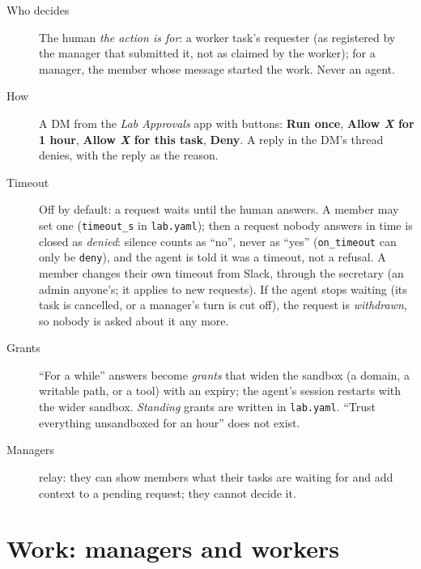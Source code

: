 \documentclass[11pt]{article}
\newcommand{\code}[1]{\texttt{#1}}
\begin{document}
\begin{description}
  \item[Who decides] The human \emph{the action is for}: a worker task's requester (as
    registered by the manager that submitted it, not as claimed by the worker); for a
    manager, the member whose message started the work. Never an agent.
  \item[How] A DM from the \emph{Lab Approvals} app with buttons: \textbf{Run once},
    \textbf{Allow \emph{X} for 1 hour}, \textbf{Allow \emph{X} for this task}, \textbf{Deny}.
    A reply in the DM's thread denies, with the reply as the reason.
  \item[Timeout] Off by default: a request waits until the human answers. A member may set
    one (\code{timeout\_s} in \code{lab.yaml}); then a request nobody answers in time is
    closed as \emph{denied}: silence counts as ``no'', never as ``yes'' (\code{on\_timeout}
    can only be \code{deny}), and the agent is told it was a timeout, not a refusal. A
    member changes their own timeout from Slack, through the secretary (an admin anyone's;
    it applies to new requests). If the
    agent stops waiting (its task is cancelled, or a manager's turn is cut off), the
    request is \emph{withdrawn}, so nobody is asked about it any more.
  \item[Grants] ``For a while'' answers become \emph{grants} that widen the sandbox
    (a domain, a writable path, or a tool) with an expiry; the agent's session restarts
    with the wider sandbox. \emph{Standing} grants are written in \code{lab.yaml}.
    ``Trust everything unsandboxed for an hour'' does not exist.
  \item[Managers] relay: they can show members what their tasks are waiting for and add
    context to a pending request; they cannot decide it.
\end{description}

\section{Work: managers and workers}
\end{document}
